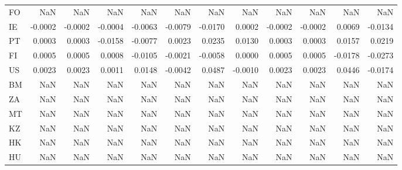 \begin{table}
\begin{tabular}{lrrrrrrrrrrr}
FO & NaN & NaN & NaN & NaN & NaN & NaN & NaN & NaN & NaN & NaN & NaN \\
IE & -0.0002 & -0.0002 & -0.0004 & -0.0063 & -0.0079 & -0.0170 & 0.0002 & -0.0002 & -0.0002 & 0.0069 & -0.0134 \\
PT & 0.0003 & 0.0003 & -0.0158 & -0.0077 & 0.0023 & 0.0235 & 0.0130 & 0.0003 & 0.0003 & 0.0157 & 0.0219 \\
FI & 0.0005 & 0.0005 & 0.0008 & -0.0105 & -0.0021 & -0.0058 & 0.0000 & 0.0005 & 0.0005 & -0.0178 & -0.0273 \\
US & 0.0023 & 0.0023 & 0.0011 & 0.0148 & -0.0042 & 0.0487 & -0.0010 & 0.0023 & 0.0023 & 0.0446 & -0.0174 \\
BM & NaN & NaN & NaN & NaN & NaN & NaN & NaN & NaN & NaN & NaN & NaN \\
ZA & NaN & NaN & NaN & NaN & NaN & NaN & NaN & NaN & NaN & NaN & NaN \\
MT & NaN & NaN & NaN & NaN & NaN & NaN & NaN & NaN & NaN & NaN & NaN \\
KZ & NaN & NaN & NaN & NaN & NaN & NaN & NaN & NaN & NaN & NaN & NaN \\
HK & NaN & NaN & NaN & NaN & NaN & NaN & NaN & NaN & NaN & NaN & NaN \\
HU & NaN & NaN & NaN & NaN & NaN & NaN & NaN & NaN & NaN & NaN & NaN \\
\bottomrule
\end{tabular}
\end{table}
